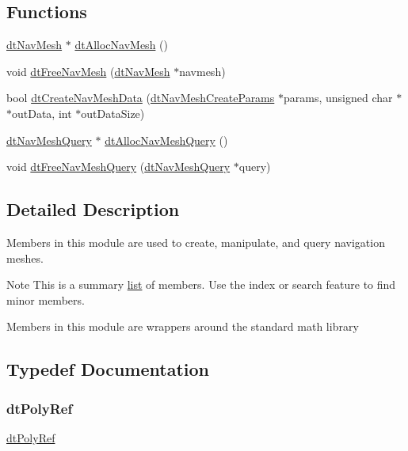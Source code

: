 \subsection*{Functions}
\begin{DoxyCompactItemize}
\item 
\hyperlink{classdtNavMesh}{dt\+Nav\+Mesh} $\ast$ \hyperlink{group__detour_ga73648d53c5a414855a2aa264aab9263c}{dt\+Alloc\+Nav\+Mesh} ()
\item 
void \hyperlink{group__detour_gad938af5675a2f62c7c3830b38ea9a184}{dt\+Free\+Nav\+Mesh} (\hyperlink{classdtNavMesh}{dt\+Nav\+Mesh} $\ast$navmesh)
\item 
bool \hyperlink{group__detour_gaf56ac19e79e5948fdb1051158577e648}{dt\+Create\+Nav\+Mesh\+Data} (\hyperlink{structdtNavMeshCreateParams}{dt\+Nav\+Mesh\+Create\+Params} $\ast$params, unsigned char $\ast$$\ast$out\+Data, int $\ast$out\+Data\+Size)
\item 
\hyperlink{classdtNavMeshQuery}{dt\+Nav\+Mesh\+Query} $\ast$ \hyperlink{group__detour_gae547f165feefc955136130c8e22f207a}{dt\+Alloc\+Nav\+Mesh\+Query} ()
\item 
void \hyperlink{group__detour_ga24ccc133f15a0aa85f06f1c1ead2e6c4}{dt\+Free\+Nav\+Mesh\+Query} (\hyperlink{classdtNavMeshQuery}{dt\+Nav\+Mesh\+Query} $\ast$query)
\end{DoxyCompactItemize}


\subsection{Detailed Description}
Members in this module are used to create, manipulate, and query navigation meshes.

\begin{DoxyNote}{Note}
This is a summary \hyperlink{protocollist-p}{list} of members. Use the index or search feature to find minor members.
\end{DoxyNote}
Members in this module are wrappers around the standard math library 

\subsection{Typedef Documentation}
\mbox{\label{group__detour_gab4e0b2257a670c1a800057999612b466}} 
\subsubsection{\texorpdfstring{dt\+Poly\+Ref}{dtPolyRef}\hspace{0.1cm}{\footnotesize\ttfamily [1/2]}}
{\footnotesize\ttfamily \hyperlink{group__detour_gab4e0b2257a670c1a800057999612b466}{dt\+Poly\+Ref}}

